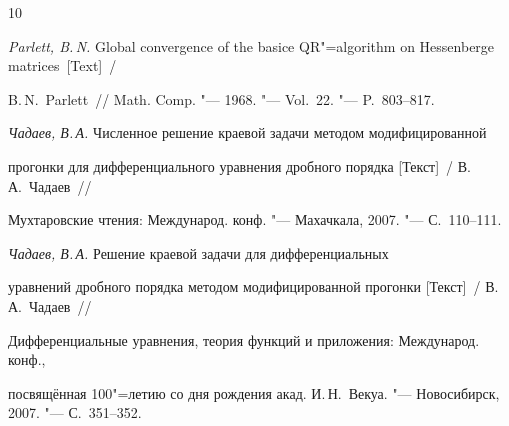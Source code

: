 \begin{thebibliography}{10}
\item {\it Parlett, B.\,N.} Global convergence of the basice QR"=algorithm on Hessenberge matrices~[Text]~/

B.\,N.~Parlett~/\!/ Math. Comp. "--- 1968. "--- Vol.~22. "--- P.~803--817.



\item  {\it Чадаев, В.\,А.} Численное решение краевой задачи методом модифицированной

прогонки для дифференциального уравнения дробного порядка [Текст]~/ В.\,А.~Чадаев~/\!/

Мухтаровские чтения: Международ. конф. "---  Махачкала, 2007. "--- С.~110--111.



\item  {\it Чадаев, В.\,А.} Решение краевой задачи для дифференциальных  

уравнений дробного порядка методом модифицированной прогонки [Текст]~/ В.\,А.~Чадаев~/\!/ 

Дифференциальные уравнения, теория функций и приложения: Международ. конф.,

посвящённая 100"=летию со дня рождения акад. И.\,Н.~Векуа. "--- Новосибирск, 2007. "---  С.~351--352.

\end{thebibliography}



\vspace{5mm}

\thispagestyle{empty}

\makeengtitle



%